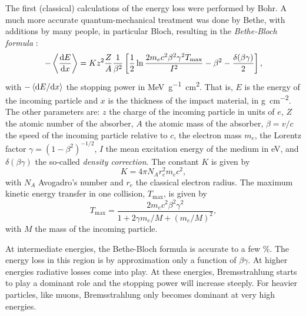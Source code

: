 The first (classical) calculations of the energy loss were performed by Bohr.
A much more accurate quantum-mechanical treatment was done by Bethe, with
additions by many people, in particular Bloch, resulting in the
\emph{Bethe-Bloch formula} \cite[286]{pdg-review:2010}:
\begin{equation}
-\left\langle \frac{\mathrm{d} E}{\mathrm{d} x} \right\rangle = Kz^2\frac{Z}{A}\frac{1}{\beta^2}
\left[\frac{1}{2}\ln\frac{2m_e c^2 \beta^2 \gamma^2
T_{\mathrm{max}}}{I^2} - \beta^2 - \frac{\delta(\beta\gamma)}{2}\right],
\label{eq:bethe-bloch}
\end{equation}
with $-\left\langle \mathrm{d} E / \mathrm{d} x \right\rangle$ the stopping power in
\si{\mega\electronvolt\per\gram\centi\meter\squared}.  That is, $E$ is the
energy of the incoming particle and $x$ is the thickness of the impact material,
in \si{\gram\per\centi\meter\squared}.  The other parameters are: $z$ the charge
of the incoming particle in units of $e$, $Z$ the atomic number of the absorber,
$A$ the atomic mass of the absorber, $\beta = v / c$ the speed of the incoming
particle relative to $c$, the electron mass $m_e$, the Lorentz factor $\gamma =
(1 - \beta^2)^{-1/2}$, $I$ the mean excitation energy of the medium in
\si{\electronvolt}, and $\delta(\beta\gamma)$ the so-called \emph{density
correction}.  The constant $K$ is given by
\begin{equation}
K = 4\pi N_A r_e^2 m_e c^2,
\end{equation}
with $N_A$ Avogadro's number and $r_e$ the classical electron radius.  The
maximum kinetic energy transfer in one collision, $T_\mathrm{max}$, is given by
\begin{equation}
T_\mathrm{max} = \frac{2 m_e c^2 \beta^2 \gamma^2}{1 + 2\gamma m_e / M +
                                                   (m_e / M)^2},
\end{equation}
with $M$ the mass of the incoming particle.

At intermediate energies, the Bethe-Bloch formula is accurate to a few
\si{\percent}.  The energy loss in this region is by approximation only a
function of $\beta\gamma$.  At higher energies radiative losses come into play.
At these energies, Bremsstrahlung starts to play a dominant role and the
stopping power will increase steeply.  For heavier particles, like muons,
Bremsstrahlung only becomes dominant at very high energies.

